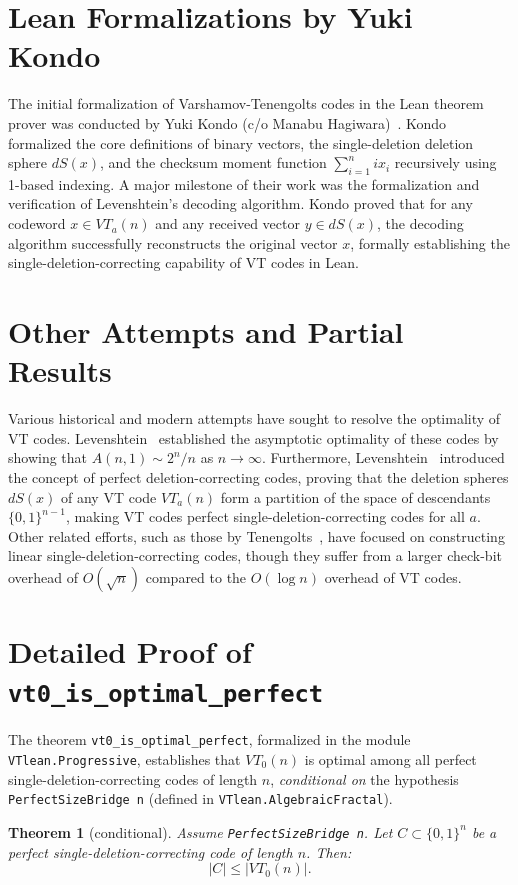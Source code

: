 \documentclass[11pt,a4paper]{article}
\newtheorem{theorem}{Theorem}
\theoremstyle{definition}
\begin{document}
\section{Lean Formalizations by Yuki Kondo}
The initial formalization of Varshamov-Tenengolts codes in the Lean theorem prover was conducted by Yuki Kondo (c/o Manabu Hagiwara)~\cite{Kondo22}. Kondo formalized the core definitions of binary vectors, the single-deletion deletion sphere $dS(x)$, and the checksum moment function $\sum_{i=1}^n i x_i$ recursively using 1-based indexing. A major milestone of their work was the formalization and verification of Levenshtein's decoding algorithm. Kondo proved that for any codeword $x \in VT_a(n)$ and any received vector $y \in dS(x)$, the decoding algorithm successfully reconstructs the original vector $x$, formally establishing the single-deletion-correcting capability of VT codes in Lean.

\section{Other Attempts and Partial Results}
Various historical and modern attempts have sought to resolve the optimality of VT codes. Levenshtein~\cite{Lev65} established the asymptotic optimality of these codes by showing that $A(n, 1) \sim 2^n / n$ as $n \to \infty$. Furthermore, Levenshtein~\cite{Lev92} introduced the concept of perfect deletion-correcting codes, proving that the deletion spheres $dS(x)$ of any VT code $VT_a(n)$ form a partition of the space of descendants $\{0,1\}^{n-1}$, making VT codes perfect single-deletion-correcting codes for all $a$. Other related efforts, such as those by Tenengolts~\cite{Ten76}, have focused on constructing linear single-deletion-correcting codes, though they suffer from a larger check-bit overhead of $O(\sqrt{n})$ compared to the $O(\log n)$ overhead of VT codes.

\section{Detailed Proof of \texttt{vt0\_is\_optimal\_perfect}}
The theorem \texttt{vt0\_is\_optimal\_perfect}, formalized in the module \texttt{VTlean.Progressive}, establishes that $VT_0(n)$ is optimal among all perfect single-deletion-correcting codes of length $n$, \emph{conditional on} the hypothesis \texttt{PerfectSizeBridge n} (defined in \texttt{VTlean.AlgebraicFractal}).
\begin{theorem}[conditional]
Assume \texttt{PerfectSizeBridge n}. Let $C \subset \{0,1\}^n$ be a perfect single-deletion-correcting code of length $n$. Then:
\begin{equation}
|C| \le |VT_0(n)|.
\end{equation}
\end{theorem}
\end{document}
